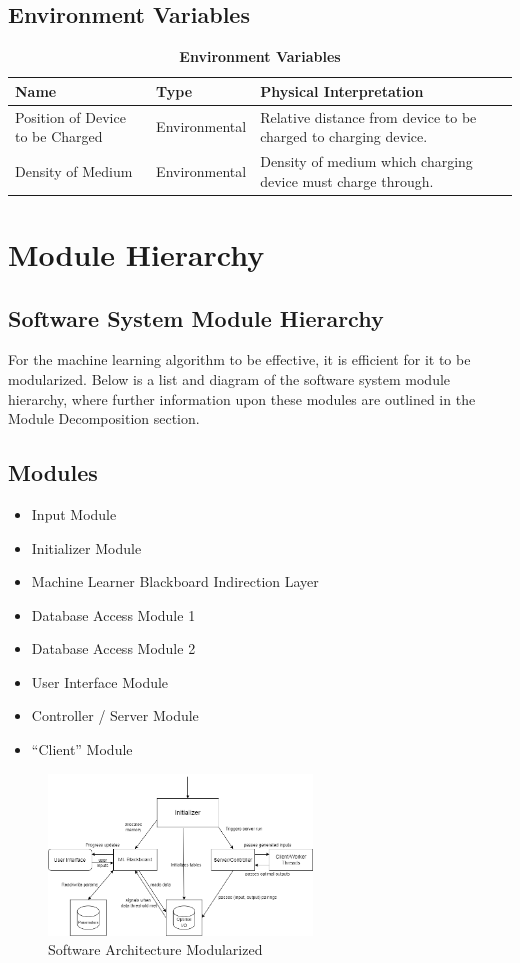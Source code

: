 \documentclass[12pt, titlepage]{article}
\begin{document}
\subsection{Environment Variables}
\begin{table}[H]
\caption{\bf Environment Variables}
\begin{tabular}{ |p{4cm}|p{3cm}|p{7cm}|} 
 \hline
\bf Name & \bf Type & \bf Physical Interpretation\\
 \hline
 Position of Device to be Charged & Environmental & Relative distance from device to be charged to charging device.\\
 \hline
 Density of Medium & Environmental & Density of medium which charging device must charge through.\\
\hline
\end{tabular}
\end{table}
 

\section{Module Hierarchy}
\subsection{Software System Module Hierarchy}
For the machine learning algorithm to be effective, it is efficient for it to be modularized. Below is a list and diagram of the software system module hierarchy, where further information upon these modules are outlined in the Module Decomposition section.

\subsection{Modules}
\begin{itemize}
  \item Input Module
  \item Initializer Module
  \item Machine Learner Blackboard Indirection Layer
  \item Database Access Module 1
  \item Database Access Module 2
  \item User Interface Module
  \item Controller / Server Module
  \item “Client” Module
\end{itemize}

\begin{figure}[htp]
  \centering
  \includegraphics[width=7cm]{images/Figure7.png}
  \caption[Software Architecture Modules]{Software Architecture Modularized }
  \label{fig:figure7}
\end{figure}
\end{document}
